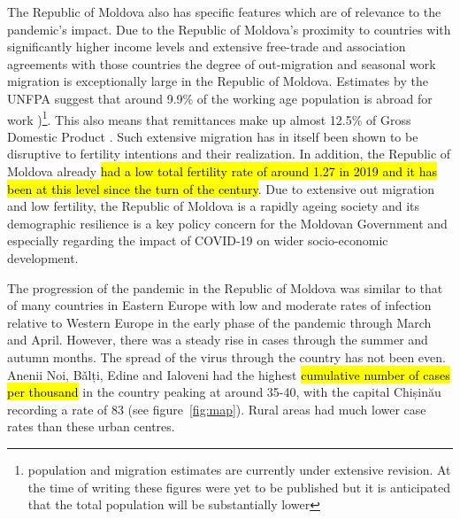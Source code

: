 \documentclass[10pt,letterpaper]{article}
\begin{document}
The Republic of Moldova also has specific features which are of relevance to the pandemic's impact. Due to the Republic of Moldova's proximity to countries with significantly higher income levels and extensive free-trade and association agreements with those countries the degree of out-migration and seasonal work migration is exceptionally large in the Republic of Moldova. Estimates by the UNFPA suggest that around 9.9\% of the working age population is abroad for work \cite{prodan2016impact})\footnote{population and migration estimates are currently under extensive revision. At the time of writing these figures were yet to be published but it is anticipated that the total population will be substantially lower}. This also means that remittances make up almost 12.5\% of Gross Domestic Product \cite{ito2017remittances}. Such extensive migration has in itself been shown to be disruptive to fertility intentions and their realization. In addition, the Republic of Moldova already \hl{had a low total fertility rate of around 1.27 in 2019 and it has been at this level since the turn of the century}. Due to extensive out migration and low fertility, the Republic of Moldova is a rapidly ageing society and its demographic resilience is a key policy concern for the Moldovan Government and especially regarding the impact of COVID-19 on wider socio-economic development. 

The progression of the pandemic in the Republic of Moldova was similar to that of many countries in Eastern Europe with low and moderate rates of infection relative to Western Europe in the early phase of the pandemic through March and April. However, there was a steady rise in cases through the summer and autumn months. The spread of the virus through the country has not been even. Anenii Noi, B\v{a}lți, Edine and Ialoveni had the highest \hl{cumulative number of cases per thousand} in the country peaking at around 35-40, with the capital Chișinău recording a rate of 83 (see figure~\ref{fig:map}). Rural areas had much lower case rates than these urban centres. 
\end{document}
